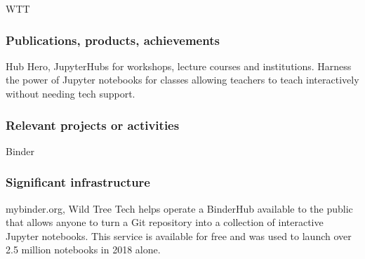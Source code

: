 \begin{sitedescription}{WTT}
\subsubsection*{Publications, products, achievements}

\begin{compactenum}
\item Hub Hero, JupyterHubs for workshops, lecture courses and institutions. Harness the power of Jupyter notebooks for classes allowing teachers to teach interactively without needing tech support.
\end{compactenum}

\subsubsection*{Relevant projects or activities}

\begin{compactenum}
\item Binder
\end{compactenum}

\subsubsection*{Significant infrastructure}
\begin{compactenum}
\item mybinder.org, Wild Tree Tech helps operate a BinderHub available to the public that allows anyone to turn a Git repository into a collection of interactive Jupyter notebooks. This service is available for free and was used to launch over 2.5 million notebooks in 2018 alone.
\end{compactenum}

\end{sitedescription}
